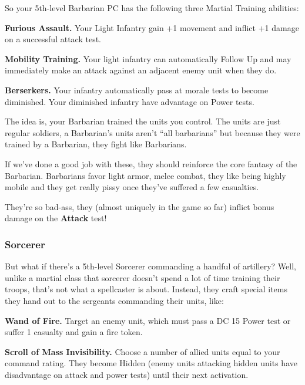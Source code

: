 \documentclass[letterpaper,twocolumn,openany,nodeprecatedcode]{dndbook}
\begin{document}
So your 5th-level Barbarian PC has the following three Martial Training abilities:

\textbf{Furious Assault.} Your Light Infantry gain +1 movement and inflict +1 damage on a successful attack test.

\textbf{Mobility Training.} Your light infantry can automatically Follow Up and may immediately make an attack against an adjacent enemy unit when they do.

\textbf{Berserkers.} Your infantry automatically pass at morale tests to become diminished. Your diminished infantry have advantage on Power tests.

The idea is, your Barbarian trained the units you control. The units are just regular soldiers, a Barbarian’s units aren’t “all barbarians” but because they were trained by a Barbarian, they fight like Barbarians.

If we’ve done a good job with these, they should reinforce the core fantasy of the Barbarian. Barbarians favor light armor, melee combat, they like being highly mobile and they get really pissy once they’ve suffered a few casualties.

They’re so bad-ass, they (almost uniquely in the game so far) inflict bonus damage on the \textbf{Attack} test!


\subsubsection{Sorcerer}

But what if there’s a 5th-level Sorcerer commanding a handful of artillery? Well, unlike a martial class that sorcerer doesn’t spend a lot of time training their troops, that’s not what a spellcaster is about. Instead, they craft special items they hand out to the sergeants commanding their units, like:

\textbf{Wand of Fire.} Target an enemy unit, which must pass a DC 15 Power test or suffer 1 casualty and gain a fire token.

\textbf{Scroll of Mass Invisibility.} Choose a number of allied units equal to your command rating. They become Hidden (enemy units attacking hidden units have disadvantage on attack and power tests) until their next activation.
\end{document}
